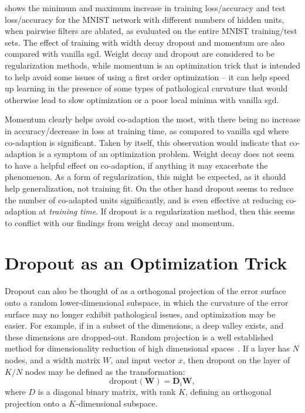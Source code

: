\documentclass[thesis]{subfiles}
\begin{document}
 shows the minimum and maximum increase in training loss/accuracy and test loss/accuracy for the MNIST network with different numbers of hidden units, when pairwise filters are ablated, as evaluated on the entire MNIST training/test sets. The effect of training with width decay dropout and momentum are also compared with vanilla \gls{sgd}. Weight decay and dropout are considered to be regularization methods, while momentum is an optimization trick that is intended to help avoid some issues of using a first order optimization -- it can help speed up learning in the presence of some types of pathological curvature that would otherwise lead to slow optimization or a poor local minima with vanilla \gls{sgd}.

Momentum clearly helps avoid co-adaption the most, with there being no increase in accuracy/decrease in loss at training time, as compared to vanilla \gls{sgd} where co-adaption is significant. Taken by itself, this observation would indicate that co-adaption is a symptom of an optimization problem. Weight decay does not seem to have a helpful effect on co-adaption, if anything it may exacerbate the phenomenon. As a form of regularization, this might be expected, as it should help generalization, not training fit. On the other hand dropout seems to reduce the number of co-adapted units significantly, and is even effective at reducing co-adaption at \emph{training time}. If dropout is a regularization method, then this seems to conflict with our findings from weight decay and momentum.

\section{Dropout as an Optimization Trick}\label{dropoutasopttrick}
Dropout can also be thought of as a orthogonal projection of the error surface onto a random lower-dimensional subspace, in which the curvature of the error surface may no longer exhibit pathological issues, and optimization may be easier. For example, if in a subset of the dimensions, a deep valley exists, and these dimensions are dropped-out. Random projection is a well established method for dimensionality reduction of high dimensional spaces~\citep{kaski1998dimensionality,fodor2002survey}.
If a layer has $N$ nodes, and a width matrix $W$, and input vector $x$, then dropout on the layer of $K/N$ nodes may be defined as the transformation:
\begin{equation}
    \textrm{dropout}(\mathbf{W}) = \mathbf{D}_{i} \mathbf{W},
\end{equation}
where $D$ is a diagonal binary matrix, with rank $K$, defining an orthogonal projection onto a $K$-dimensional subspace. 
\end{document}
